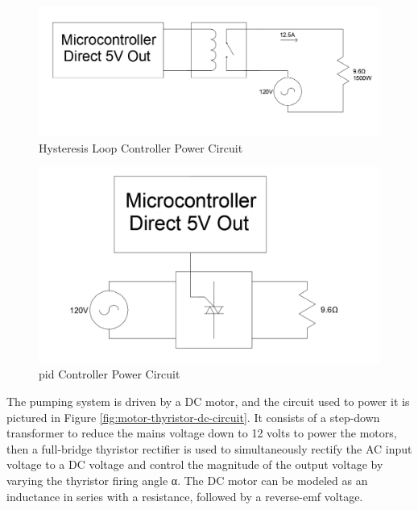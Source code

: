 \documentclass{article}
\begin{document}
\begin{figure}[H]
\begin{center}
\includegraphics[scale=0.40]{heater-hysteresis-circuit.png}
\caption{Hysteresis Loop Controller Power Circuit}
\label{fig:heater-hysteresis-circuit}
\end{center}
\end{figure}

\begin{figure}[H]
\begin{center}
\includegraphics[scale=0.30]{heater-pid-circuit.png}
\caption{\gls{pid} Controller Power Circuit}
\label{fig:heater-pid-circuit}
\end{center}
\end{figure}

The pumping system is driven by a DC motor, and the circuit used to power it is pictured in Figure \ref{fig:motor-thyristor-dc-circuit}. It consists of a step-down transformer to reduce the mains voltage down to 12 volts to power the motors, then a full-bridge thyristor rectifier is used to simultaneously rectify the AC input voltage to a DC voltage and control the magnitude of the output voltage by varying the thyristor firing angle α. The DC motor can be modeled as an inductance in series with a resistance, followed by a reverse-emf voltage.
\end{document}
